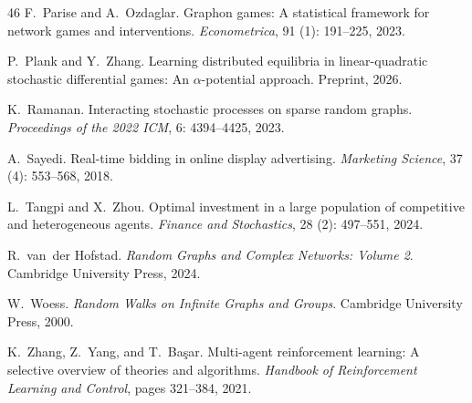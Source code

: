 \documentclass[11pt]{article}
\numberwithin{equation}{section}
\begin{document}
\begin{thebibliography}{46}
F.~Parise and A.~Ozdaglar.
\newblock Graphon games: A statistical framework for network games and
  interventions.
\newblock \emph{Econometrica}, 91 (1): 191--225, 2023.

P.~Plank and Y.~Zhang.
\newblock Learning distributed equilibria in linear-quadratic stochastic
  differential games: An $\alpha$-potential approach.
\newblock Preprint, 2026.

K.~Ramanan.
\newblock Interacting stochastic processes on sparse random graphs.
\newblock \emph{Proceedings of the 2022 ICM}, 6: 4394--4425, 2023.

A.~Sayedi.
\newblock Real-time bidding in online display advertising.
\newblock \emph{Marketing Science}, 37 (4): 553--568, 2018.

L.~Tangpi and X.~Zhou.
\newblock Optimal investment in a large population of competitive and
  heterogeneous agents.
\newblock \emph{Finance and Stochastics}, 28 (2): 497--551,
  2024.

R.~van~der Hofstad.
\newblock \emph{Random Graphs and Complex Networks: Volume 2}.
\newblock Cambridge University Press, 2024.

W.~Woess.
\newblock \emph{Random Walks on Infinite Graphs and Groups}.
\newblock Cambridge University Press, 2000.

K.~Zhang, Z.~Yang, and T.~Ba{\c{s}}ar.
\newblock Multi-agent reinforcement learning: A selective overview of theories
  and algorithms.
\newblock \emph{Handbook of Reinforcement Learning and Control}, pages
  321--384, 2021.

\end{thebibliography}
\end{document}
